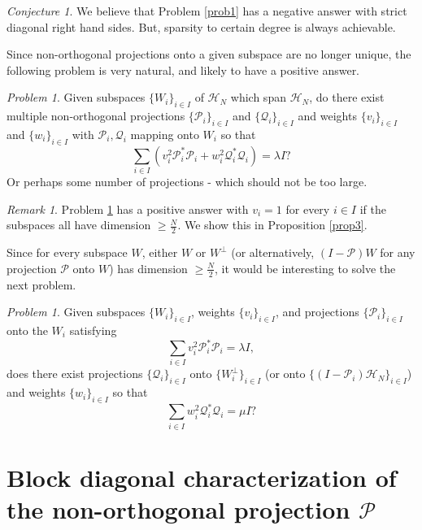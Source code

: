 \documentclass[11pt,reqno]{amsart}
\theoremstyle{remark}
\newtheorem{conjecture}[thm]{Conjecture}
\newtheorem{remark}[thm]{Remark}
\newtheorem{problem}[thm]{Problem}
\begin{document}
\begin{conjecture}\label{conj1}
We believe that Problem \ref{prob1} has a negative answer with strict diagonal right hand sides.  But, sparsity to certain degree is always achievable.
\end{conjecture}

Since non-orthogonal projections onto a given subspace are no longer unique, the following problem is very natural, and likely to have a positive answer.

\begin{problem}\label{prob2}
Given subspaces $\{W_i\}_{i\in I}$ of
${\mathcal H}_N$ which span ${\mathcal H}_N$, do there exist multiple non-orthogonal
projections $\{{\mathcal P}_i\}_{i\in I}$ and $\{{\mathcal Q}_i\}_{i\in I}$ and weights $\{v_i\}_{i\in I}$ and $\{w_i\}_{i\in I}$  with ${\mathcal P}_i,{\mathcal Q}_i$ mapping onto $W_i$ so that
\[ \sum_{i\in I}(v_i^2{\mathcal P}_i^*{\mathcal P}_i+w_i^2{\mathcal Q}_i^*{\mathcal Q}_i) = \lambda I?\]
Or perhaps some number of projections - which should not be too large.
\end{problem}

\begin{remark}\label{rem1}
Problem \ref{prob2} has a positive answer with $v_i=1$ for every $i\in I$ if the subspaces all have dimension
$\ge \frac{N}{2}$.  We show this in Proposition \ref{prop3}.
\end{remark}

Since for every subspace $W$, either $W$ or $W^{\perp}$ (or alternatively, $(I-{\mathcal P})W$
for any projection ${\mathcal P}$ onto $W$) has dimension $\ge \frac{N}{2}$, it would be interesting to solve the next problem.

\begin{problem}\label{prob3}
Given subspaces $\{W_i\}_{i\in I}$, weights $\{v_i\}_{i\in I}$, and projections $\{{\mathcal P}_i\}_{i\in I}$ onto the
$W_i$ satisfying
\[ \sum_{i\in I}v_i^2{\mathcal P}_i^*{\mathcal P}_i = \lambda I,\]
does there exist projections $\{{\mathcal Q}_i\}_{i\in I}$ onto $\{W_i^{\perp}\}_{i\in I}$
(or onto $\{(I-{\mathcal P}_i){\mathcal H}_N\}_{i\in I}$) and weights $\{w_i\}_{i\in I}$ so that
\[ \sum_{i\in I}w_i^2{\mathcal Q}_i^*{\mathcal Q}_i = \mu I?\]
\end{problem}

\section{Block diagonal characterization of the non-orthogonal projection ${{\mathcal P}}$}\label{section1}
\end{document}
